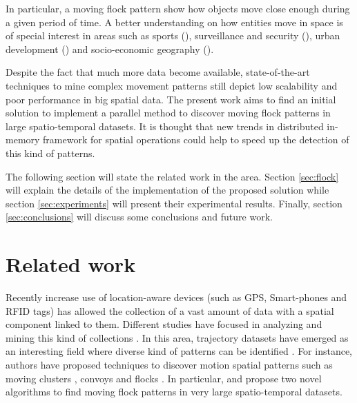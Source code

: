 \documentclass[12pt]{scrartcl}
\begin{document}
In particular, a moving flock pattern show how objects move close enough during a given period of time.  A better understanding on how entities move in space is of special interest in areas such as sports (\cite{iwase_tracking_2002}),  surveillance and security (\cite{makris_path_2002,piciarelli_trajectory_2005}), urban development (\cite{huang_trajgraph:_2016, long_combining_2015}) and socio-economic geography (\cite{frank_life_2000}).

Despite the fact that much more data become available, state-of-the-art techniques to mine complex movement patterns still depict low scalability and poor performance in big spatial data.  The present work aims to find an initial solution to implement a parallel method to discover moving flock patterns in large spatio-temporal datasets.  It is thought that new trends in distributed in-memory framework for spatial operations could help to speed up the detection of this kind of patterns.

The following section will state the related work in the area.  Section \ref{sec:flock} will explain the details of the implementation of the proposed solution while section \ref{sec:experiments} will present their experimental results. Finally, section \ref{sec:conclusions} will discuss some conclusions and future work. 

\section{Related work}
% 

Recently increase use of location-aware devices (such as GPS, Smart-phones and RFID tags) has allowed the collection of a vast amount of data with a spatial component linked to them.  Different studies have focused in analyzing and mining this kind of collections \citep{leung_knowledge_2010}\citep{miller_geographic_2001}.  In this area, trajectory datasets have emerged as an interesting field where diverse kind of patterns can be identified \citep{zheng_computing_2011}\citep{vieira_spatio-temporal_2013}.  For instance, authors have proposed techniques to discover motion spatial patterns such as moving clusters \citep{kalnis_discovering_2005}, convoys \citep{jeung_discovery_2008} and flocks \citep{benkert_reporting_2008, gudmundsson_computing_2006}.  In particular, \cite{vieira_-line_2009} and \cite{turdukulov_visual_2014} propose two novel algorithms to find moving flock patterns in very large spatio-temporal datasets.  
 
\end{document}
